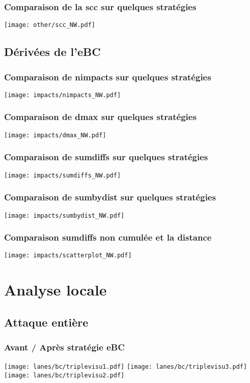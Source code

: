 \documentclass[aspectratio=169]{beamer}
\begin{document}
    \begin{frame}
        \frametitle{Comparaison de la scc sur quelques stratégies}
        \centering
        \texttt{[image: other/scc\_NW.pdf]}
    \end{frame}

    \subsection{Dérivées de l'eBC}
    
    \begin{frame}
        \frametitle{Comparaison de nimpacts sur quelques stratégies}
        \centering
        \texttt{[image: impacts/nimpacts\_NW.pdf]}
    \end{frame}

    \begin{frame}
        \frametitle{Comparaison de dmax sur quelques stratégies}
        \centering
        \texttt{[image: impacts/dmax\_NW.pdf]}
    \end{frame}

    \begin{frame}
        \frametitle{Comparaison de sumdiffs sur quelques stratégies}
        \centering
        \texttt{[image: impacts/sumdiffs\_NW.pdf]}
    \end{frame}

    \begin{frame}
        \frametitle{Comparaison de sumbydist sur quelques stratégies}
        \centering
        \texttt{[image: impacts/sumbydist\_NW.pdf]}
    \end{frame}

    \begin{frame}
        \frametitle{Comparaison sumdiffs non cumulée et la distance}
        \centering
        \texttt{[image: impacts/scatterplot\_NW.pdf]}
    \end{frame}

    \section{Analyse locale}
    \subsection{Attaque entière}
    
    \begin{frame}
        \frametitle{Avant / Après stratégie eBC}
        \texttt{[image: lanes/bc/triplevisu1.pdf]}
        \texttt{[image: lanes/bc/triplevisu3.pdf]}
        \texttt{[image: lanes/bc/triplevisu2.pdf]}
    \end{frame}
\end{document}
